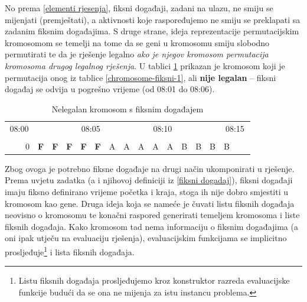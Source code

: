 \documentclass[times, utf8, zavrsni]{fer}
\begin{document}
No prema \ref{elementi rjesenja}, fiksni događaji, zadani na ulazu, ne smiju se mijenjati (premještati), a aktivnosti koje raspoređujemo ne smiju se preklapati sa zadanim fiksnim događajima. S druge strane, ideja reprezentacije permutacijskim kromosomom se temelji na tome da se geni u kromosomu smiju slobodno permutirati te da je rješenje legalno \textit{ako je njegov kromosom permutacija kromosoma drugog legalnog rješenja}. U tablici \ref{chromosome-fiksni-2} prikazan je kromosom koji je permutacija onog iz tablice \ref{chromosome-fiksni-1}, ali \textbf{nije legalan} -- fiksni događaj se odvija u pogrešno vrijeme (od 08:01 do 08:06).

\begin{table}[!htbp]
\centering
\caption{Nelegalan kromosom s fiksnim događajem}
\label{chromosome-fiksni-2}
\begin{tabular}{lllllcllllclllllcll}
\multicolumn{3}{c}{08:00} &  &  & \multicolumn{4}{c}{08:05} &  & \multicolumn{4}{c}{08:10} &  &  & \multicolumn{3}{c}{08:15} \\
 & \multicolumn{1}{l|}{} &  &  &  & \multicolumn{1}{l}{} & \multicolumn{1}{l|}{} &  &  &  & \multicolumn{1}{l}{} & \multicolumn{1}{l|}{} &  &  &  &  & \multicolumn{1}{l|}{} &  &  \\ \cline{3-17}
 & \multicolumn{1}{l|}{} & \multicolumn{1}{c|}{0} & \multicolumn{1}{c|}{\textbf{F}} & \multicolumn{1}{c|}{\textbf{F}} & \multicolumn{1}{c|}{\textbf{F}} & \multicolumn{1}{c|}{\textbf{F}} & \multicolumn{1}{c|}{\textbf{F}} & \multicolumn{1}{c|}{A} & \multicolumn{1}{c|}{A} & \multicolumn{1}{c|}{A} & \multicolumn{1}{c|}{A} & \multicolumn{1}{c|}{A} & \multicolumn{1}{c|}{B} & \multicolumn{1}{c|}{B} & \multicolumn{1}{c|}{B} & \multicolumn{1}{c|}{B} &  &  \\ \cline{3-17}
\end{tabular}
\end{table}

Zbog ovoga je potrebno fiksne događaje na drugi način ukomponirati u rješenje. Prema uvjetu zadatka (a i njihovoj definiciji iz \ref{fiksni dogadaj}), fiksni događaji imaju fiksno definirano vrijeme početka i kraja, stoga ih nije dobro smjestiti u kromosom kao gene. Druga ideja koja se nameće je čuvati listu fiksnih događaja neovisno o kromosomu te konačni raspored generirati temeljem kromosoma i liste fiksnih događaja. Kako kromosom tad nema informaciju o fiksnim događajima (a oni ipak utječu na evaluaciju rješenja), evaluacijskim funkcijama se implicitno prosljeđuje\footnote{Listu fiksnih događaja prosljeđujemo kroz konstruktor razreda evaluacijske funkcije budući da se ona ne mijenja za istu instancu problema.} i lista fiksnih događaja.
\end{document}
